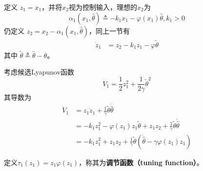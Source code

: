 
定义 $z_1 = x_1$，并将$x_2$视为控制输入，理想的$x_2$为
\begin{equation*}
 \alpha_1 (x_1,\hat{\theta}) \triangleq  - k_1 x_1 - \varphi (x_1) \hat{\theta} ,k_1>0
\end{equation*}
仍定义 $z_2 = x_2 - \alpha_1 (x_1, \hat{\theta})$，同上一节有
\begin{align*}
  \dot{z}_1 & = z_2 - k_1 z_1 - \varphi \tilde{\theta}
\end{align*}
其中 $\tilde{\theta} \triangleq \hat{\theta} - \theta$。

考虑候选Lyapunov函数
\[ V_1=\frac12z_1^2+\frac{1}{2\gamma}\tilde{\theta}^2\]
其导数为\begin{align*}
    \dot{V}_1&=z_1\dot{z}_1+\frac{1}{\gamma}\tilde{\theta}\dot{\hat{\theta}}\\
    &=-k_1z_1^2-\varphi(z_1)z_1\tilde{\theta}+z_1z_2+\frac{1}{\gamma}\tilde{\theta}\dot{\hat{\theta}}\\
    &=-k_1z_1^2+z_1z_2+\frac{1}{\gamma}\tilde{\theta}(\dot{\hat{\theta}}-\gamma \varphi(z_1)z_1)
\end{align*}

定义$\tau_1(z_1)=z_1\varphi(z_1)$，称其为{\bf 调节函数（tuning function）}。


